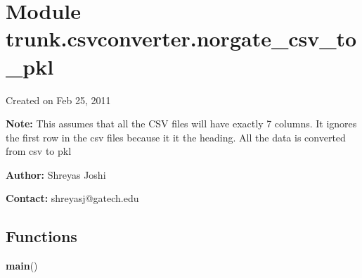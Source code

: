 %
%
%


\section{Module trunk.csvconverter.norgate\_csv\_to\_pkl}

    \label{trunk:csvconverter:norgate_csv_to_pkl}
Created on Feb 25, 2011

\textbf{Note:} This assumes that all the CSV files will have exactly 7 columns. It ignores
the first row in the csv files because it it the heading. All the data is 
converted from csv to pkl



\textbf{Author:} Shreyas Joshi



\textbf{Contact:} shreyasj@gatech.edu





  \subsection{Functions}

    \label{trunk:csvconverter:norgate_csv_to_pkl:main}

    \vspace{0.5ex}

\hspace{.8\funcindent}\begin{boxedminipage}{\funcwidth}

    \raggedright \textbf{main}()

\setlength{\parskip}{2ex}
\setlength{\parskip}{1ex}
    \end{boxedminipage}


